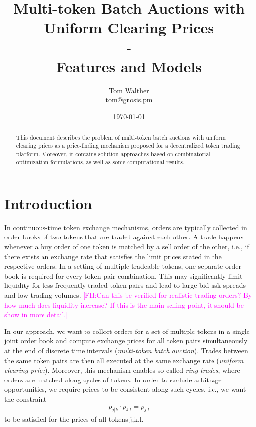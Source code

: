 \documentclass[11pt,parskip=full]{scrartcl}%
\title{
  Multi-token Batch Auctions with Uniform Clearing Prices\\
  - \\
  \Large Features and Models}
\author{Tom Walther \\ tom@gnosis.pm}
\date{\today}
\newcommand*{\ie}{i.e., }
\newcommand{\FH}[1]{\textcolor{magenta}{[FH:#1]}}
\begin{document}
\maketitle


\begin{abstract}
  This document describes the problem of multi-token batch auctions with uniform clearing prices as
  a price-finding mechanism proposed for a decentralized token trading platform.
  Moreover, it contains solution approaches based on combinatorial optimization formulations, as
  well as some computational results.
\end{abstract}



\tableofcontents

\newpage
\section{Introduction}
\label{sec:introduction}

In continuous-time token exchange mechanisms, orders are typically collected in order books of two
tokens that are traded against each other.
A trade happens whenever a buy order of one token is matched by a sell order of the other, \ie if
there exists an exchange rate that satisfies the limit prices stated in the respective orders.
In a setting of multiple tradeable tokens, one separate order book is required for every token pair
combination.
This may significantly limit liquidity for less frequently traded token pairs and lead to large
bid-ask spreads and low trading volumes. \FH{Can this be verified for realistic trading orders? By how much does liquidity increase? If this is the main selling point, it should be show in more detail.}

In our approach, we want to collect orders for a set of multiple tokens in a single joint order
book and compute exchange prices for all token pairs simultaneously at the end of discrete time
intervals (\emph{multi-token batch auction}).
Trades between the same token pairs are then all executed at the same exchange rate (\emph{uniform
clearing price}).
Moreover, this mechanism enables so-called \emph{ring trades}, where orders are matched along
cycles of tokens.
In order to exclude arbitrage opportunities, we require prices to be consistent along such cycles,
\ie we want the constraint
\begin{align}
  p_{j|k} \cdot p_{k|l} = p_{j|l}
  \label{eq:arbitrage_freeness}
\end{align}
to be satisfied for the prices of all tokens j,k,l.
\end{document}
